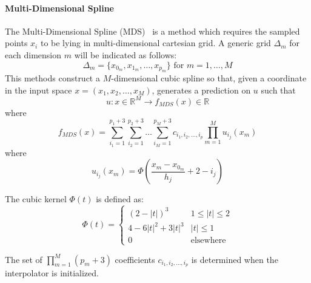 \paragraph{Multi-Dimensional Spline}
\label{sec:ND_spline}
The Multi-Dimensional Spline (MDS)~\cite{MD_spline} is a method which requires the sampled points $x_i$ to be lying in multi-dimensional cartesian grid.
A generic grid $\Delta_m$ for each dimension $m$ will be indicated as follows:
\begin{equation}
\Delta_m = \{x_{0_m},x_{1_m},\ldots,x_{p_m}\} \text{ for } m=1,\ldots,M
\end{equation}
This methods construct a $M$-dimensional cubic spline so that, given a coordinate in the input space $x=(x_1,x_2,\ldots,x_M)$, generates a prediction on $u$ such that 
\begin{equation}
u:x \in \mathbb{R}^M \rightarrow f_{MDS}(x) \in \mathbb{R}
\end{equation}
where
\begin{equation}
f_{MDS}(x)=\sum_{i_1=1}^{p_1+3} \sum_{i_2=1}^{p_2+3} \ldots \sum_{i_M=1}^{p_M+3} c_{i_1,i_2,\ldots,i_p} \prod_{m=1}^{M} u_{i_j} (x_m)
\end{equation}
where 
\begin{equation}
u_{i_j} (x_m) = \Phi\left ( \frac{x_m-x_{0_m}}{h_j}+2-i_j  \right )
\end{equation}

The cubic kernel $\Phi(t)$ is defined as:
\begin{equation}
\Phi(t) = \left\{\begin{matrix}
(2-\left | t \right |)^3 & 1\leq \left | t \right |\leq 2 \\
4-6\left | t \right |^2+3\left | t \right |^3 & \left | t \right |\leq 1\\ 
0 & \text{elsewhere}
\end{matrix}\right.
\end{equation}

The set of $\prod_{m=1}^{M}(p_m+3)$ coefficients $c_{i_1,i_2,\ldots,i_p}$  is determined when the interpolator is initialized.

